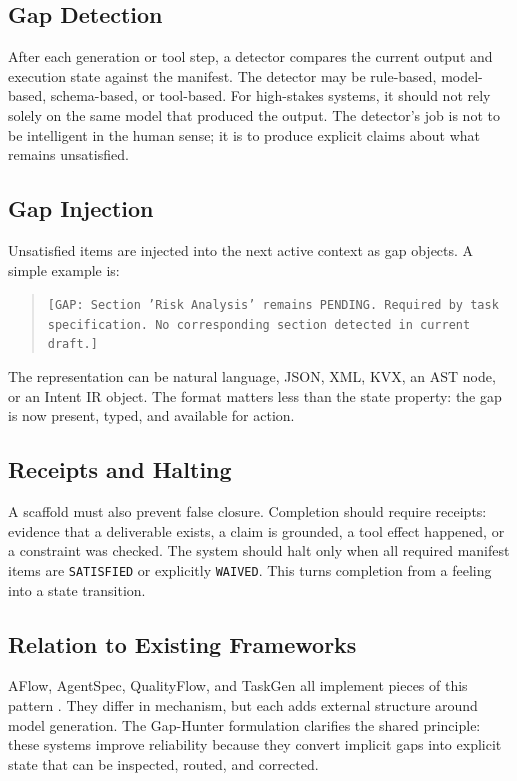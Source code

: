 \documentclass[10pt,conference]{IEEEtran}
\begin{document}
\subsection{Gap Detection}
After each generation or tool step, a detector compares the current output and execution state against the manifest. The detector may be rule-based, model-based, schema-based, or tool-based. For high-stakes systems, it should not rely solely on the same model that produced the output. The detector's job is not to be intelligent in the human sense; it is to produce explicit claims about what remains unsatisfied.

\subsection{Gap Injection}
Unsatisfied items are injected into the next active context as gap objects. A simple example is:
\begin{quote}
\texttt{[GAP: Section 'Risk Analysis' remains PENDING. Required by task specification. No corresponding section detected in current draft.]}
\end{quote}
The representation can be natural language, JSON, XML, KVX, an AST node, or an Intent IR object. The format matters less than the state property: the gap is now present, typed, and available for action.

\subsection{Receipts and Halting}
A scaffold must also prevent false closure. Completion should require receipts: evidence that a deliverable exists, a claim is grounded, a tool effect happened, or a constraint was checked. The system should halt only when all required manifest items are \texttt{SATISFIED} or explicitly \texttt{WAIVED}. This turns completion from a feeling into a state transition.

\subsection{Relation to Existing Frameworks}
AFlow, AgentSpec, QualityFlow, and TaskGen all implement pieces of this pattern \cite{zhang2025aflow,wang2025agentspec,hu2025qualityflow,tan2024taskgen}. They differ in mechanism, but each adds external structure around model generation. The Gap-Hunter formulation clarifies the shared principle: these systems improve reliability because they convert implicit gaps into explicit state that can be inspected, routed, and corrected.
\end{document}
